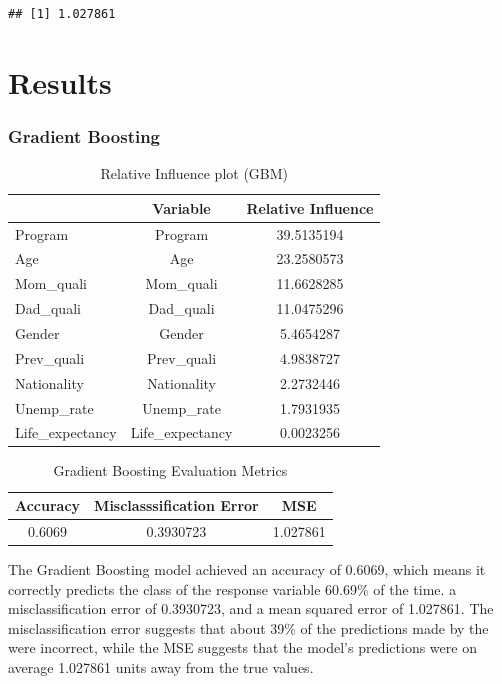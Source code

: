 \documentclass[
]{article}
\begin{document}
\begin{verbatim}
## [1] 1.027861
\end{verbatim}

\hypertarget{results}{%
\section{Results}\label{results}}

\hypertarget{gradient-boosting}{%
\subsubsection{Gradient Boosting}\label{gradient-boosting}}

\begin{table}

\caption{\label{tab:unnamed-chunk-22}Relative Influence plot (GBM)}
\centering
\begin{tabular}[t]{l|c|c}
\hline
  & Variable & Relative Influence\\
\hline
Program & Program & 39.5135194\\
\hline
Age & Age & 23.2580573\\
\hline
Mom\_quali & Mom\_quali & 11.6628285\\
\hline
Dad\_quali & Dad\_quali & 11.0475296\\
\hline
Gender & Gender & 5.4654287\\
\hline
Prev\_quali & Prev\_quali & 4.9838727\\
\hline
Nationality & Nationality & 2.2732446\\
\hline
Unemp\_rate & Unemp\_rate & 1.7931935\\
\hline
Life\_expectancy & Life\_expectancy & 0.0023256\\
\hline
\end{tabular}
\end{table}

\begin{table}

\caption{\label{tab:unnamed-chunk-22}Gradient Boosting Evaluation Metrics}
\centering
\begin{tabular}[t]{c|c|c}
\hline
Accuracy & Misclasssification Error & MSE\\
\hline
0.6069 & 0.3930723 & 1.027861\\
\hline
\end{tabular}
\end{table}

The Gradient Boosting model achieved an accuracy of 0.6069, which means
it correctly predicts the class of the response variable 60.69\% of the
time. a misclassification error of 0.3930723, and a mean squared error
of 1.027861. The misclassification error suggests that about 39\% of the
predictions made by the were incorrect, while the MSE suggests that the
model's predictions were on average 1.027861 units away from the true
values.
\end{document}
